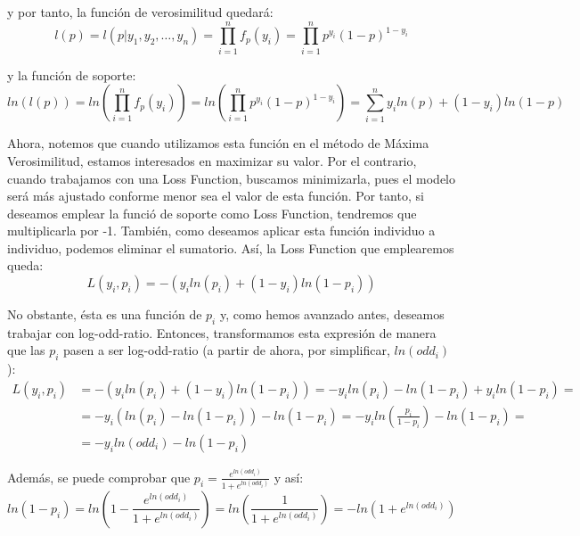 \documentclass[12pt,twoside]{article}
\begin{document}
\noindent
y por tanto, la función de verosimilitud quedará:
\begin{equation*}
l(p) = l(p|y_1, y_2, \dots, y_n) = \prod_{i=1}^n f_p(y_i) = \prod_{i=1}^n p^{y_i}(1-p)^{1-y_i}
\end{equation*}

\noindent
y la función de soporte:
\begin{equation*}
ln(l(p)) = ln \left( \prod_{i=1}^n f_p(y_i) \right) = ln \left( \prod_{i=1}^n p^{y_i}(1-p)^{1-y_i} \right) = \sum_{i=1}^n y_i ln(p) + (1-y_i)ln(1-p)
\end{equation*}

Ahora, notemos que cuando utilizamos esta función en el método de Máxima Verosimilitud, estamos interesados en maximizar su valor. Por el contrario, cuando trabajamos con una Loss Function, buscamos minimizarla, pues el modelo será más ajustado conforme menor sea el valor de esta función. Por tanto, si deseamos emplear la funció  de soporte como Loss Function, tendremos que multiplicarla por -1. También, como deseamos aplicar esta función individuo a individuo, podemos eliminar el sumatorio. Así, la Loss Function que emplearemos queda:
\begin{equation*}
L(y_i, p_i) = -( y_i ln(p_i) + (1-y_i)ln(1-p_i))
\end{equation*}

No obstante, ésta es una función de $p_i$ y, como hemos avanzado antes, deseamos trabajar con log-odd-ratio. Entonces, transformamos esta expresión de manera que las $p_i$ pasen a ser log-odd-ratio (a partir de ahora, por simplificar, $ln(odd_i)$):
\begin{equation*}
\begin{split}
L(y_i, p_i) &= -(y_i ln(p_i) + (1-y_i)ln(1-p_i)) = -y_i ln(p_i) - ln(1-p_i) + y_i ln(1-p_i) = \\
& = -y_i(ln(p_i) - ln(1-p_i)) - ln(1-p_i) = -y_i ln \left( \frac{p_i}{1-p_i} \right) - ln(1-p_i) = \\
& = -y_i ln(odd_i) - ln(1-p_i)
\end{split}
\end{equation*}

Además, se puede comprobar que $p_i = \frac{e^{ln(odd_i)}}{1 + e^{ln(odd_i)}}$ y así:
\begin{equation*}
ln(1-p_i) = ln \left( 1- \frac{e^{ln(odd_i)}}{1 + e^{ln(odd_i)}} \right) = ln \left( \frac{1}{1 + e^{ln(odd_i)}} \right) = - ln \left( 1 + e^{ln(odd_i)} \right)
\end{equation*}
\end{document}
